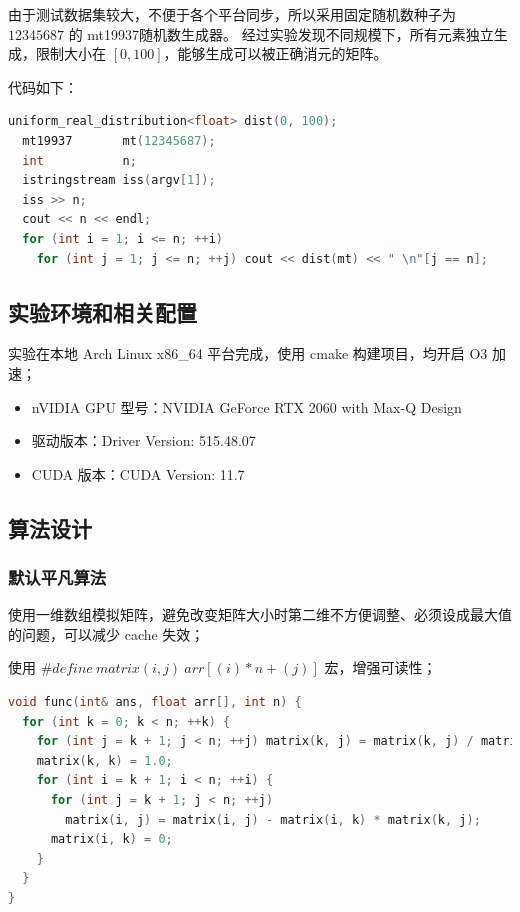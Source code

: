 \documentclass[a4paper]{article}
\begin{document}
由于测试数据集较大，不便于各个平台同步，所以采用固定随机数种子为 $12345687$ 的 mt19937随机数生成器。
经过实验发现不同规模下，所有元素独立生成，限制大小在 $[0, 100]$，能够生成可以被正确消元的矩阵。

代码如下：

\begin{lstlisting}[frame=trbl,language={C++}]
  uniform_real_distribution<float> dist(0, 100);
  mt19937       mt(12345687);
  int           n;
  istringstream iss(argv[1]);
  iss >> n;
  cout << n << endl;
  for (int i = 1; i <= n; ++i)
    for (int j = 1; j <= n; ++j) cout << dist(mt) << " \n"[j == n];
\end{lstlisting}

\subsection{实验环境和相关配置}

实验在本地 Arch Linux x86\_64 平台完成，使用 cmake 构建项目，均开启 O3 加速；

\begin{itemize}
  \item nVIDIA GPU 型号：NVIDIA GeForce RTX 2060 with Max-Q Design
  \item 驱动版本：Driver Version: 515.48.07
  \item CUDA 版本：CUDA Version: 11.7
\end{itemize}

\subsection{算法设计}

\subsubsection{默认平凡算法}

使用一维数组模拟矩阵，避免改变矩阵大小时第二维不方便调整、必须设成最大值的问题，可以减少 cache 失效；

使用 $\#define\ matrix(i, j)\ arr[(i) * n + (j)]$ 宏，增强可读性；

\begin{lstlisting}[frame=trbl,language={C++}]
void func(int& ans, float arr[], int n) {
  for (int k = 0; k < n; ++k) {
    for (int j = k + 1; j < n; ++j) matrix(k, j) = matrix(k, j) / matrix(k, k);
    matrix(k, k) = 1.0;
    for (int i = k + 1; i < n; ++i) {
      for (int j = k + 1; j < n; ++j)
        matrix(i, j) = matrix(i, j) - matrix(i, k) * matrix(k, j);
      matrix(i, k) = 0;
    }
  }
}
\end{lstlisting}
\end{document}
